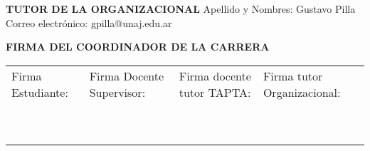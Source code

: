 \documentclass[12pt]{article}
\begin{document}
\begin{framed}
\noindent\textbf{TUTOR DE LA ORGANIZACIONAL}\newline
Apellido y Nombres: Gustavo Pilla \newline
Correo electr\'{o}nico: gpilla@unaj.edu.ar
\end{framed}

\begin{framed}
    \noindent\textbf{FIRMA DEL COORDINADOR DE LA CARRERA}
\end{framed}
\vfill
\noindent\begin{tabular}{|P{3.3cm}|P{3.3cm}|P{3.3cm}|P{3.3cm}|}
\hline
Firma Estudiante: & Firma Docente Supervisor: & Firma docente tutor TAPTA: & Firma tutor Organizacional: \\
~ & ~ & ~ & ~ \\
~ & ~ & ~ & ~ \\
\hline
\end{tabular}
\newpage


\end{document}
